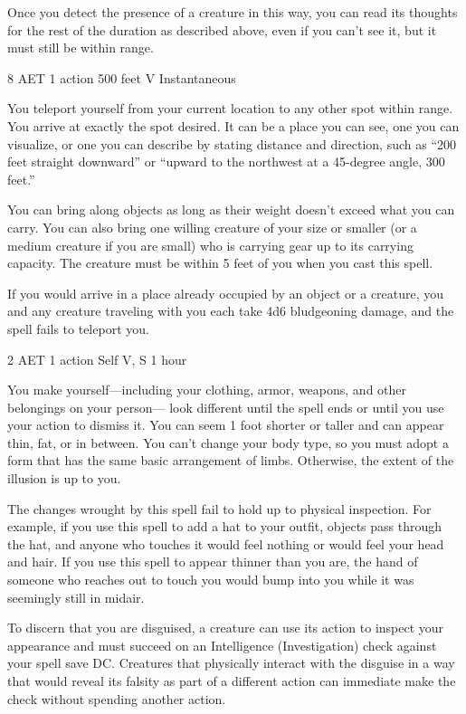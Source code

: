 Once you detect the presence of a creature in this way, you can read its thoughts for the rest of the duration as described above, even if you can't see it, but it must still be within range.


{8 AET}
{1 action}
{500 feet}
{V}
{Instantaneous}

You teleport yourself from your current location to any other spot within range. You arrive at exactly the spot desired. It can be a place you can see, one you can visualize, or one you can describe by stating distance and direction, such as “200 feet straight downward” or “upward to the northwest at a 45-degree angle, 300 feet.”

You can bring along objects as long as their weight doesn't exceed what you can carry. You can also bring one willing creature of your size or smaller (or a medium creature if you are small) who is carrying gear up to its carrying capacity. The creature must be within 5 feet of you when you cast this spell.

If you would arrive in a place already occupied by an object or a creature, you and any creature traveling with you each take 4d6 bludgeoning damage, and the spell fails to teleport you.


{2 AET}
{1 action}
{Self}
{V, S}
{1 hour}

You make yourself—including your clothing, armor, weapons, and other belongings on your person— look different until the spell ends or until you use your action to dismiss it. You can seem 1 foot shorter or taller and can appear thin, fat, or in between. You can't change your body type, so you must adopt a form that has the same basic arrangement of limbs. Otherwise, the extent of the illusion is up to you.

The changes wrought by this spell fail to hold up to physical inspection. For example, if you use this spell to add a hat to your outfit, objects pass through the hat, and anyone who touches it would feel nothing or would feel your head and hair. If you use this spell to appear thinner than you are, the hand of someone who reaches out to touch you would bump into you while it was seemingly still in midair.

To discern that you are disguised, a creature can use its action to inspect your appearance and must succeed on an Intelligence (Investigation) check against your spell save DC. Creatures that physically interact with the disguise in a way that would reveal its falsity as part of a different action can immediate make the check without spending another action.



